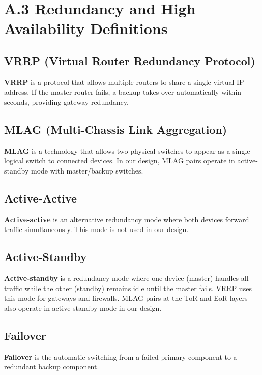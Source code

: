 \section*{A.3 Redundancy and High Availability Definitions}

\subsection*{VRRP (Virtual Router Redundancy Protocol)}
\label{def:vrrp}
\textbf{VRRP} is a protocol that allows multiple routers to share a single 
virtual IP address. If the master router fails, a backup takes over 
automatically within seconds, providing gateway redundancy.

\subsection*{MLAG (Multi-Chassis Link Aggregation)}
\label{def:mlag}
\textbf{MLAG} is a technology that allows two physical switches to appear as 
a single logical switch to connected devices. In our design, MLAG pairs operate 
in active-standby mode with master/backup switches.

\subsection*{Active-Active}
\label{def:activeactive}
\textbf{Active-active} is an alternative redundancy mode where both devices forward traffic 
simultaneously. This mode is not used in our design.

\subsection*{Active-Standby}
\label{def:activestandby}
\textbf{Active-standby} is a redundancy mode where one device (master) handles 
all traffic while the other (standby) remains idle until the master fails. 
VRRP uses this mode for gateways and firewalls. MLAG pairs at the ToR and EoR 
layers also operate in active-standby mode in our design.

\subsection*{Failover}
\label{def:failover}
\textbf{Failover} is the automatic switching from a failed primary component 
to a redundant backup component.

